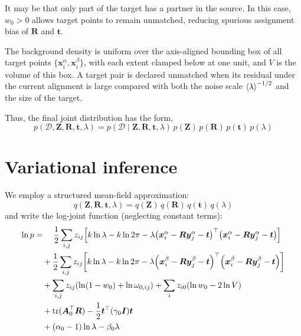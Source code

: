 \documentclass{article}
\newcommand{\lh}{\mathopen{}\mathclose\bgroup\left}
\newcommand{\rh}{\aftergroup\egroup\right}
\newcommand{\E}[1]{\lh\langle #1 \rh\rangle}
\newcommand{\m}[1]{\boldsymbol{#1}}
\newcommand{\setD}{\mathcal{D}}
\DeclareMathOperator{\trace}{tr}
\begin{document}
It may be that only part of the target has a partner in the source.
In this case, $w_0 > 0$ allows target points to remain unmatched, reducing
spurious assignment bias of $\m{R}$ and $\m{t}$.

The background density is uniform over the axis-aligned bounding box of
all target points $\{ \m{x}_i^\alpha, \m{x}_i^\beta \}$, with each
extent clamped below at one unit, and $V$ is the volume of this box.
A target pair is declared unmatched when its residual under the current
alignment is large compared with both the noise scale $\E{\lambda}^{-1/2}$
and the size of the target.

Thus, the final joint distribution has the form,
\begin{equation}
p(\setD, \m{Z}, \m{R}, \m{t}, \lambda) =
 p(\setD \mid \m{Z}, \m{R}, \m{t}, \lambda) \,
 p(\m{Z}) \,
 p(\m{R}) \, p(\m{t}) \,
 p(\lambda)
\end{equation}

\clearpage
\section{Variational inference}
We employ a structured mean-field approximation:
\begin{equation}
q(\m{Z}, \m{R}, \m{t}, \lambda) =
 q(\m{Z}) \,
 q(\m{R}) \,
 q(\m{t}) \,
 q(\lambda)
\end{equation}
and write the log-joint function (neglecting constant terms):
\begin{equation}
\begin{aligned}
\ln p &= \quad
   \frac{1}{2} \sum_{i,j} z_{ij} \lh[ k \ln \lambda - k \ln 2\pi
    - \lambda
    \lh( \m{x}_i^\alpha - \m{R} \m{y}_j^\alpha - \m{t} \rh)^\top
    \lh( \m{x}_i^\alpha - \m{R} \m{y}_j^\alpha - \m{t} \rh)
   \rh]
\\ &\quad
 + \frac{1}{2} \sum_{i,j} z_{ij} \lh[ k \ln \lambda - k \ln 2\pi
    - \lambda
    \lh( \m{x}_i^\beta - \m{R} \m{y}_j^\beta - \m{t} \rh)^\top
    \lh( \m{x}_i^\beta - \m{R} \m{y}_j^\beta - \m{t} \rh)
   \rh]
\\ &\quad
 + \sum_{i,j} z_{ij} \lh( \ln (1 - w_0) + \ln \omega_{0,ij} \rh)
 + \sum_i z_{i0} \lh( \ln w_0 - 2 \ln V \rh)
\\ &\quad
 + \trace(\m{A}_0^\top \m{R})
 -\frac{1}{2} \m{t}^\top (\gamma_0 \m{I}) \m{t}
\\ &\quad
 + (\alpha_0 - 1) \ln \lambda - \beta_0 \lambda
\end{aligned}
\end{equation}
\end{document}

